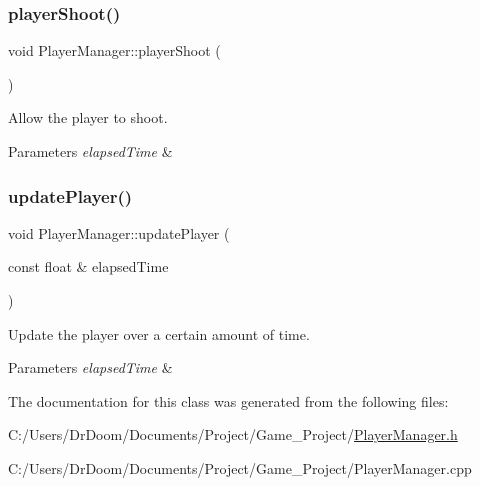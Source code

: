 \subsubsection{\texorpdfstring{player\+Shoot()}{playerShoot()}}
{\footnotesize\ttfamily void Player\+Manager\+::player\+Shoot (\begin{DoxyParamCaption}{ }\end{DoxyParamCaption})}



Allow the player to shoot. 


\begin{DoxyParams}{Parameters}
{\em elapsed\+Time} & \\
\hline
\end{DoxyParams}
\mbox{\label{class_player_manager_a171946405d72c219802315721e09467d}} 
\subsubsection{\texorpdfstring{update\+Player()}{updatePlayer()}}
{\footnotesize\ttfamily void Player\+Manager\+::update\+Player (\begin{DoxyParamCaption}\item[{const float \&}]{elapsed\+Time }\end{DoxyParamCaption})}



Update the player over a certain amount of time. 


\begin{DoxyParams}{Parameters}
{\em elapsed\+Time} & \\
\hline
\end{DoxyParams}


The documentation for this class was generated from the following files\+:\begin{DoxyCompactItemize}
\item 
C\+:/\+Users/\+Dr\+Doom/\+Documents/\+Project/\+Game\+\_\+\+Project/\hyperlink{_player_manager_8h}{Player\+Manager.\+h}\item 
C\+:/\+Users/\+Dr\+Doom/\+Documents/\+Project/\+Game\+\_\+\+Project/Player\+Manager.\+cpp\end{DoxyCompactItemize}
